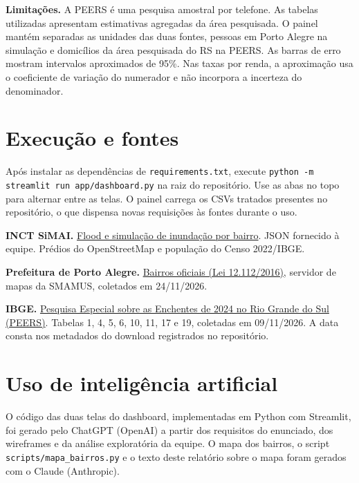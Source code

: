 \documentclass[11pt,a4paper]{article}
\begin{document}
\textbf{Limitações.} A PEERS é uma pesquisa amostral por telefone. As tabelas
utilizadas apresentam estimativas agregadas da área pesquisada. O painel mantém
separadas as unidades das duas fontes, pessoas em Porto Alegre na simulação e
domicílios da área pesquisada do RS na PEERS. As barras de erro mostram
intervalos aproximados de 95\%. Nas taxas por renda, a aproximação usa o
coeficiente de variação do numerador e não incorpora a incerteza do denominador.

\section*{\color{azul}Execução e fontes}
Após instalar as dependências de \texttt{requirements.txt}, execute
\texttt{python -m streamlit run app/dashboard.py} na raiz do repositório. Use as
abas no topo para alternar entre as telas. O painel carrega os CSVs tratados
presentes no repositório, o que dispensa novas requisições às fontes durante o uso.

\textbf{INCT SiMAI.} \href{http://vhlab.com.br/INCT/floods/}{Flood e simulação de
inundação por bairro}. JSON fornecido à equipe. Prédios do OpenStreetMap e
população do Censo 2022/IBGE.

\textbf{Prefeitura de Porto Alegre.}
\href{https://gis-smamus.portoalegre.rs.gov.br/server/rest/services/01_PUBLICACOES/bairros_2016/MapServer}{Bairros
oficiais (Lei 12.112/2016)}, servidor de mapas da SMAMUS, coletados em 24/11/2026.

\textbf{IBGE.}
\href{https://ftp.ibge.gov.br/Meio_Ambiente/PEERS/2024/Abrangencia_xlsx.zip}{Pesquisa
Especial sobre as Enchentes de 2024 no Rio Grande do Sul (PEERS)}. Tabelas 1, 4,
5, 6, 10, 11, 17 e 19, coletadas em 09/11/2026. A data consta nos metadados do
download registrados no repositório.

\section*{\color{azul}Uso de inteligência artificial}
O código das duas telas do dashboard, implementadas em Python com Streamlit,
foi gerado pelo ChatGPT (OpenAI) a partir dos requisitos do enunciado, dos
wireframes e da análise exploratória da equipe. O mapa dos bairros, o script
\texttt{scripts/mapa\_bairros.py} e o texto deste relatório sobre o mapa foram
gerados com o Claude (Anthropic).
\end{document}
